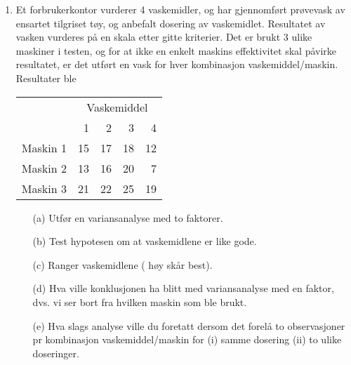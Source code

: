 \begin{enumerate}
\item Et forbrukerkontor vurderer 4 vaskemidler, og har gjennomført 
prøvevask av ensartet tilgriset tøy, og anbefalt dosering av vaskemidlet.
Resultatet av vasken vurderes på en skala etter gitte kriterier.
Det er brukt 3 ulike maskiner i testen, og for at ikke en enkelt maskins effektivitet
skal påvirke resultatet, er det utført en vask for hver kombinasjon
vaskemiddel/maskin. Resultater ble
\begin{center}
\begin{tabular}{l|rrrr}
\multicolumn{1}{c}{} &\multicolumn{4}{c}{Vaskemiddel} \\
        &  1 &  2 &  3 &  4  \\ \hline
Maskin 1& 15 & 17 & 18 & 12  \\
Maskin 2& 13 & 16 & 20 &  7  \\
Maskin 3& 21 & 22 & 25 & 19  \\ \hline
\end{tabular}
\end{center}
\begin{itemize}
\item[(a)] Utfør en variansanalyse med to faktorer. 
\item[(b)] Test hypotesen om at vaskemidlene er like gode.
\item[(c)] Ranger vaskemidlene ( høy skår best).
\item[(d)] Hva ville konklusjonen ha blitt med variansanalyse med en faktor,
           dvs. vi ser bort fra hvilken maskin som ble brukt.
\item[(e)] Hva slags analyse ville du foretatt dersom det forelå to
           observasjoner pr kombinasjon vaskemiddel/maskin for
           (i) samme dosering (ii) to ulike doseringer.
\end{itemize}


\end{enumerate}
